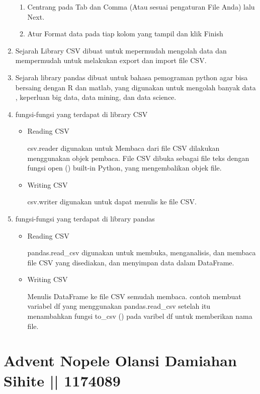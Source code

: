 \begin{enumerate}
\begin{enumerate}
        \item Centrang pada Tab dan Comma (Atau sesuai pengaturan File Anda) lalu Next.
        \item Atur Format data pada tiap kolom yang tampil dan klik Finish
    \end{enumerate}
    \item Sejarah Library CSV  dibuat untuk mepermudah mengolah data dan mempermudah untuk melakukan export dan import file CSV.
    \item Sejarah library pandas dibuat untuk bahasa pemograman python agar bisa bersaing dengan  R dan matlab, yang digunakan untuk mengolah banyak data , keperluan big data, data mining, dan data science.
    \item fungsi-fungsi yang terdapat di library CSV
    \begin{itemize}
        \item Reading CSV
        \par csv.reader digunakan untuk Membaca dari file CSV dilakukan menggunakan objek pembaca. File CSV dibuka sebagai file teks dengan fungsi open () built-in Python, yang mengembalikan objek file.
        \item Writing CSV
        \par csv.writer digunakan untuk dapat menulis ke file CSV.
    \end{itemize}
    \item fungsi-fungsi yang terdapat di library pandas
    \begin{itemize}
        \item Reading CSV
        \par pandas.read\_csv digunakan untuk membuka, menganalisis, dan membaca file CSV yang disediakan, dan menyimpan data dalam DataFrame.
        \item Writing CSV
        \par  Menulis DataFrame ke file CSV semudah membaca. contoh membuat variabel df yang menggunakan pandas.read\_csv setelah itu menambahkan fungsi to\_csv () pada varibel df untuk memberikan nama file.
    \end{itemize}
    
\end{enumerate}

\section{Advent Nopele Olansi Damiahan Sihite || 1174089}
